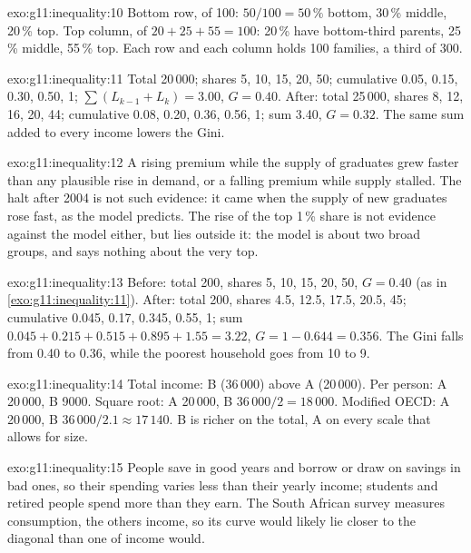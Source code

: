 \begin{solution}{exo:g11:inequality:10}
Bottom row, of 100: $50/100 = 50\,\%$ bottom, 30\,\% middle, 20\,\% top. Top column, of $20 + 25 + 55 = 100$: 20\,\% have bottom-third parents, 25\,\%
middle, 55\,\% top. Each row and each column holds 100 families, a third of 300.
\end{solution}

\begin{solution}{exo:g11:inequality:11}
Total 20\,000; shares 5, 10, 15, 20, 50; cumulative 0.05, 0.15, 0.30, 0.50, 1; $\sum(L_{k-1} + L_k) = 3.00$, $G = 0.40$. After: total 25\,000, shares 8, 12, 16, 20, 44;
cumulative 0.08, 0.20, 0.36, 0.56, 1; sum 3.40, $G = 0.32$. The same sum added to every income lowers the Gini.
\end{solution}

\begin{solution}{exo:g11:inequality:12}
A rising premium while the supply of graduates grew faster than any plausible rise in demand, or a falling premium while supply stalled. The halt after 2004 is not such
evidence: it came when the supply of new graduates rose fast, as the model predicts. The rise of the top 1\,\% share is not evidence against the model either, but lies
outside it: the model is about two broad groups, and says nothing about the very top.
\end{solution}

\begin{solution}{exo:g11:inequality:13}
Before: total 200, shares 5, 10, 15, 20, 50, $G = 0.40$ (as in \cref{exo:g11:inequality:11}). After: total 200, shares 4.5, 12.5, 17.5, 20.5, 45; cumulative 0.045, 0.17,
0.345, 0.55, 1; sum $0.045 + 0.215 + 0.515 + 0.895 + 1.55 = 3.22$, $G = 1 - 0.644 = 0.356$. The Gini falls from 0.40 to 0.36, while the poorest household goes from 10 to 9.
\end{solution}

\begin{solution}{exo:g11:inequality:14}
Total income: B (36\,000) above A (20\,000). Per person: A 20\,000, B 9000. Square root: A 20\,000, B $36\,000/2 = 18\,000$. Modified OECD: A 20\,000, B $36\,000/2.1 \approx 17\,140$.
B is richer on the total, A on every scale that allows for size.
\end{solution}

\begin{solution}{exo:g11:inequality:15}
People save in good years and borrow or draw on savings in bad ones, so their spending varies less than their yearly income; students and retired people spend more than
they earn. The South African survey measures consumption, the others income, so its curve would likely lie closer to the diagonal than one of income would.
\end{solution}

